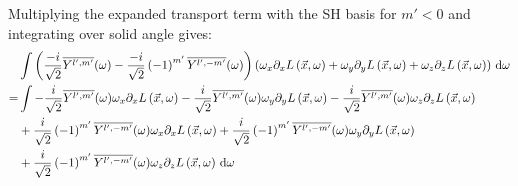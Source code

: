 \documentclass[10pt]{scrartcl}
\begin{document}
Multiplying the expanded transport term with the SH basis for $m'<0$ and integrating over solid angle gives:
\begin{align*}
&\int{\left(\frac{-i}{\sqrt{2}}\overline{Y^{l', m'}}(\omega )-\frac{-i}{\sqrt{2}}\left({-1}\right)^{m'}\overline{Y^{l', -m'}}(\omega )\right)\left(\omega_{x}\partial_xL\left (\vec{x} ,\omega \right )+\omega_{y}\partial_yL\left (\vec{x} ,\omega \right )+\omega_{z}\partial_zL\left (\vec{x} ,\omega \right )\right)\,\mathrm{d}\omega}
\\
=&
\int-\frac{i}{\sqrt{2}}\overline{Y^{l', m'}}(\omega )\omega_{x}\partial_xL\left (\vec{x} ,\omega \right )-\frac{i}{\sqrt{2}}\overline{Y^{l', m'}}(\omega )\omega_{y}\partial_yL\left (\vec{x} ,\omega \right )-\frac{i}{\sqrt{2}}\overline{Y^{l', m'}}(\omega )\omega_{z}\partial_zL\left (\vec{x} ,\omega \right )
\\&
+\frac{i}{\sqrt{2}}\left({-1}\right)^{m'}\overline{Y^{l', -m'}}(\omega )\omega_{x}\partial_xL\left (\vec{x} ,\omega \right )+\frac{i}{\sqrt{2}}\left({-1}\right)^{m'}\overline{Y^{l', -m'}}(\omega )\omega_{y}\partial_yL\left (\vec{x} ,\omega \right )
\\&
+\frac{i}{\sqrt{2}}\left({-1}\right)^{m'}\overline{Y^{l', -m'}}(\omega )\omega_{z}\partial_zL\left (\vec{x} ,\omega \right )\,\mathrm{d}\omega
\end{align*}
\end{document}
